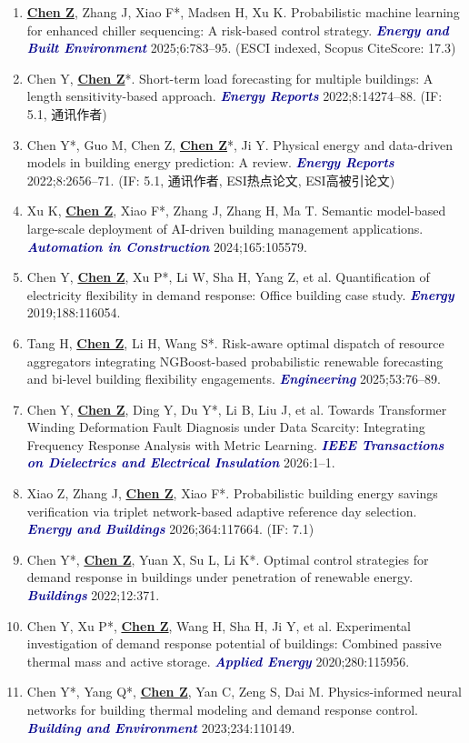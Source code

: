 \documentclass[11pt,a4paper]{article}
\newcommand{\me}[1]{\underline{\textbf{#1}}}
\newcommand{\journal}[1]{\textcolor{darkblue}{\textbf{\textit{#1}}}}
\begin{document}
\begin{enumerate}
\item \me{Chen Z}, Zhang J, Xiao F*, Madsen H, Xu K. Probabilistic machine learning for enhanced chiller sequencing: A risk-based control strategy. \journal{Energy and Built Environment} 2025;6:783--95. (ESCI indexed, Scopus CiteScore: 17.3)
\item Chen Y, \me{Chen Z}*. Short-term load forecasting for multiple buildings: A length sensitivity-based approach. \journal{Energy Reports} 2022;8:14274--88. (IF: 5.1, 通讯作者)
\item Chen Y*, Guo M, Chen Z, \me{Chen Z}*, Ji Y. Physical energy and data-driven models in building energy prediction: A review. \journal{Energy Reports} 2022;8:2656--71. (IF: 5.1, 通讯作者, ESI热点论文, ESI高被引论文)
\item Xu K, \me{Chen Z}, Xiao F*, Zhang J, Zhang H, Ma T. Semantic model-based large-scale deployment of AI-driven building management applications. \journal{Automation in Construction} 2024;165:105579.
\item Chen Y, \me{Chen Z}, Xu P*, Li W, Sha H, Yang Z, et al. Quantification of electricity flexibility in demand response: Office building case study. \journal{Energy} 2019;188:116054.
\item Tang H, \me{Chen Z}, Li H, Wang S*. Risk-aware optimal dispatch of resource aggregators integrating NGBoost-based probabilistic renewable forecasting and bi-level building flexibility engagements. \journal{Engineering} 2025;53:76--89.
\item Chen Y, \me{Chen Z}, Ding Y, Du Y*, Li B, Liu J, et al. Towards Transformer Winding Deformation Fault Diagnosis under Data Scarcity: Integrating Frequency Response Analysis with Metric Learning. \journal{IEEE Transactions on Dielectrics and Electrical Insulation} 2026:1--1.
\item Xiao Z, Zhang J, \me{Chen Z}, Xiao F*. Probabilistic building energy savings verification via triplet network-based adaptive reference day selection. \journal{Energy and Buildings} 2026;364:117664. (IF: 7.1)
\item Chen Y*, \me{Chen Z}, Yuan X, Su L, Li K*. Optimal control strategies for demand response in buildings under penetration of renewable energy. \journal{Buildings} 2022;12:371.
\item Chen Y, Xu P*, \me{Chen Z}, Wang H, Sha H, Ji Y, et al. Experimental investigation of demand response potential of buildings: Combined passive thermal mass and active storage. \journal{Applied Energy} 2020;280:115956.
\item Chen Y*, Yang Q*, \me{Chen Z}, Yan C, Zeng S, Dai M. Physics-informed neural networks for building thermal modeling and demand response control. \journal{Building and Environment} 2023;234:110149.

\end{enumerate}
\end{document}
